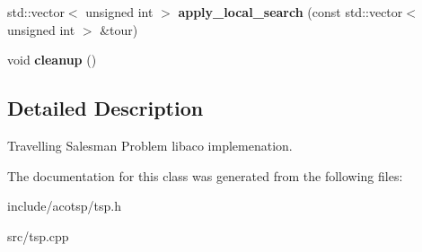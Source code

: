 \begin{DoxyCompactItemize}
\item 
\hypertarget{classTspProblem_a38ec0182d8032bfae748704aad67a26b}{std\-::vector$<$ unsigned int $>$ {\bfseries apply\-\_\-local\-\_\-search} (const std\-::vector$<$ unsigned int $>$ \&tour)}\label{classTspProblem_a38ec0182d8032bfae748704aad67a26b}

\item 
\hypertarget{classTspProblem_ad3ad8f53bbeaa2e44dfa98209ce9edf1}{void {\bfseries cleanup} ()}\label{classTspProblem_ad3ad8f53bbeaa2e44dfa98209ce9edf1}

\end{DoxyCompactItemize}


\subsection{Detailed Description}
Travelling Salesman Problem libaco implemenation. 

The documentation for this class was generated from the following files\-:\begin{DoxyCompactItemize}
\item 
include/acotsp/tsp.\-h\item 
src/tsp.\-cpp\end{DoxyCompactItemize}
